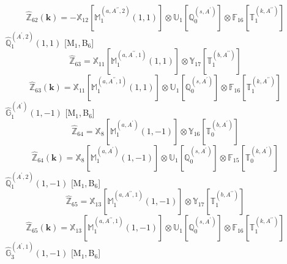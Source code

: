 \documentclass[fleqn,10pt,landscape]{article}
\begin{document}
\begin{itemize}
\begin{dmath*}
\hat{\mathbb{Z}}_{62}(\bm{k})=- \mathbb{X}_{12}[\mathbb{M}_{1}^{(a,A^{\prime\prime},2)}(1,1)] \otimes\mathbb{U}_{1}[\mathbb{Q}_{0}^{(s,A^{\prime})}] \otimes\mathbb{F}_{16}[\mathbb{T}_{1}^{(k,A^{\prime\prime})}]
\end{dmath*}
\vspace{4mm}
\noindent {} $\,\,\,\hat{\mathbb{Q}}_{1}^{(A^{\prime},2)}(1,1)$ [M$_{1}$,\,B$_{6}$]
\begin{dmath*}
\hat{\mathbb{Z}}_{63}=\mathbb{X}_{11}[\mathbb{M}_{1}^{(a,A^{\prime\prime},1)}(1,1)] \otimes\mathbb{Y}_{17}[\mathbb{T}_{1}^{(b,A^{\prime\prime})}]
\end{dmath*}
\begin{dmath*}
\hat{\mathbb{Z}}_{63}(\bm{k})=\mathbb{X}_{11}[\mathbb{M}_{1}^{(a,A^{\prime\prime},1)}(1,1)] \otimes\mathbb{U}_{1}[\mathbb{Q}_{0}^{(s,A^{\prime})}] \otimes\mathbb{F}_{16}[\mathbb{T}_{1}^{(k,A^{\prime\prime})}]
\end{dmath*}
\vspace{4mm}
\noindent {} $\,\,\,\hat{\mathbb{G}}_{1}^{(A^{\prime})}(1,-1)$ [M$_{1}$,\,B$_{6}$]
\begin{dmath*}
\hat{\mathbb{Z}}_{64}=\mathbb{X}_{8}[\mathbb{M}_{1}^{(a,A^{\prime})}(1,-1)] \otimes\mathbb{Y}_{16}[\mathbb{T}_{0}^{(b,A^{\prime})}]
\end{dmath*}
\begin{dmath*}
\hat{\mathbb{Z}}_{64}(\bm{k})=\mathbb{X}_{8}[\mathbb{M}_{1}^{(a,A^{\prime})}(1,-1)] \otimes\mathbb{U}_{1}[\mathbb{Q}_{0}^{(s,A^{\prime})}] \otimes\mathbb{F}_{15}[\mathbb{T}_{0}^{(k,A^{\prime})}]
\end{dmath*}
\vspace{4mm}
\noindent {} $\,\,\,\hat{\mathbb{Q}}_{1}^{(A^{\prime},2)}(1,-1)$ [M$_{1}$,\,B$_{6}$]
\begin{dmath*}
\hat{\mathbb{Z}}_{65}=\mathbb{X}_{13}[\mathbb{M}_{1}^{(a,A^{\prime\prime},1)}(1,-1)] \otimes\mathbb{Y}_{17}[\mathbb{T}_{1}^{(b,A^{\prime\prime})}]
\end{dmath*}
\begin{dmath*}
\hat{\mathbb{Z}}_{65}(\bm{k})=\mathbb{X}_{13}[\mathbb{M}_{1}^{(a,A^{\prime\prime},1)}(1,-1)] \otimes\mathbb{U}_{1}[\mathbb{Q}_{0}^{(s,A^{\prime})}] \otimes\mathbb{F}_{16}[\mathbb{T}_{1}^{(k,A^{\prime\prime})}]
\end{dmath*}
\vspace{4mm}
\noindent {} $\,\,\,\hat{\mathbb{G}}_{3}^{(A^{\prime},1)}(1,-1)$ [M$_{1}$,\,B$_{6}$]
\begin{dmath*}

\end{dmath*}
\end{itemize}
\end{document}
